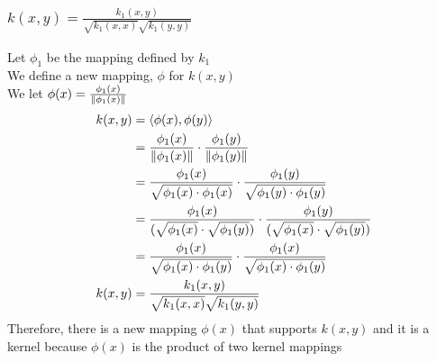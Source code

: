 \documentclass[letterpaper, 12]{article}
\begin{document}
\subsubsection{$k(x, y) = \frac{k_{1}(x ,y) }{\sqrt{k_{1}(x, x)} \sqrt{k_{1}(y, y)} }$}
Let $\phi_{1}$ be the mapping defined by $k_{1}$\\
We define a new mapping, $\phi$ for $k(x ,y)$\\
We let $\phi(x) = \frac{\phi_{1} (x)}{\norm{\phi_{1}(x)}}$\\
\begin{equation*}
\begin{split}
k(x, y) &= \langle \phi (x), \phi (y) \rangle \\
&= \frac{\phi_{1}(x)}{\norm{\phi_{1}(x)}} \cdot  \frac{\phi_{1}(y)}{\norm{\phi_{1}(y)}}\\
&= \frac{\phi_{1}(x)}{\sqrt{\phi_{1}(x) \cdot \phi_{1}(x)}} \cdot \frac{\phi_{1}(y)}{\sqrt{\phi_{1}(y) \cdot \phi_{1}(y)}}\\
&= \frac{\phi_{1}(x)}{( \sqrt{\phi_{1}(x)} \cdot \sqrt{ \phi_{1}(y)}  )}  \cdot \frac{\phi_{1}(y)}{( \sqrt{\phi_{1}(x)} \cdot \sqrt{ \phi_{1}(y)}  )} \\
&= \frac{\phi_{1}(x)}{ \sqrt{\phi_{1}(x) \cdot  \phi_{1}(y) }}  \cdot  \frac{\phi_{1}(x)}{ \sqrt{\phi_{1}(x) \cdot  \phi_{1}(y) }}\\
 k(x, y) &= \frac{k_{1}(x ,y) }{\sqrt{k_{1}(x, x)} \sqrt{k_{1}(y, y)} }
\end{split}
\end{equation*}
Therefore, there is a new mapping $\phi(x)$ that supports $k(x, y)$ and it is a kernel because $\phi(x)$
is the product of two kernel mappings
\end{document}
